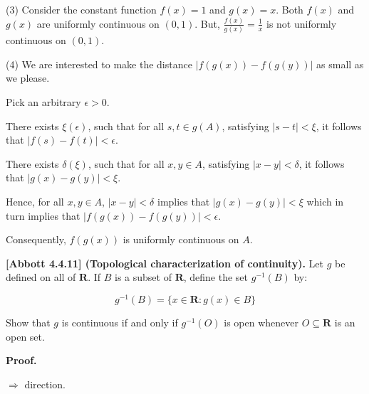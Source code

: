 \documentclass[10pt]{article}
\begin{document}
(3) Consider the constant function $\displaystyle f( x) =1$ and $\displaystyle g( x) =x$. Both $\displaystyle f( x)$ and $\displaystyle g( x)$ are uniformly continuous on $\displaystyle ( 0,1)$. But, $\displaystyle \frac{f( x)}{g( x)} =\frac{1}{x}$ is not uniformly continuous on $\displaystyle ( 0,1)$.



(4) We are interested to make the distance $\displaystyle |f( g( x)) -f( g( y)) |$ as small as we please.



Pick an arbitrary $\displaystyle \epsilon  >0$. 



There exists $\displaystyle \xi ( \epsilon )$, such that for all $\displaystyle s,t\in g( A)$, satisfying $\displaystyle |s-t|< \xi $, it follows that $\displaystyle |f( s) -f( t) |< \epsilon $.



There exists $\displaystyle \delta ( \xi )$, such that for all $\displaystyle x,y\in A$, satisfying $\displaystyle |x-y|< \delta $, it follows that $\displaystyle |g( x) -g( y) |< \xi $.



Hence, for all $\displaystyle x,y\in A$, $\displaystyle |x-y|< \delta $ implies that $\displaystyle |g( x) -g( y) |< \xi $ which in turn implies that $\displaystyle |f( g( x)) -f( g( y)) |< \epsilon $.



Consequently, $\displaystyle f( g( x))$ is uniformly continuous on $\displaystyle A$.



\textbf{[Abbott 4.4.11] (Topological characterization of continuity).} Let $\displaystyle g$ be defined on all of $\displaystyle \mathbf{R}$. If $\displaystyle B$ is a subset of $\displaystyle \mathbf{R}$, define the set $\displaystyle g^{-1}( B)$ by:


\begin{equation*}
g^{-1}( B) =\{x\in \mathbf{R} :g( x) \in B\}
\end{equation*}


Show that $\displaystyle g$ is continuous if and only if $\displaystyle g^{-1}( O)$ is open whenever $\displaystyle O\subseteq \mathbf{R}$ is an open set.



\textbf{Proof.}



$\displaystyle \Longrightarrow $ direction.
\end{document}
